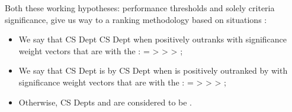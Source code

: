 \documentclass[a4paper,12pt,english]{sphinxhowto}
\begin{document}
Both these working hypotheses: performance  thresholds and solely  criteria significance, give us way to a ranking methodology based on  situations :
\begin{itemize}
\item {} 
We say that CS Dept   CS Dept  when  positively outranks  with  significance weight vectors that are  with the :  =  \textgreater{}  \textgreater{}  \textgreater{} ;

\item {} 
We say that CS Dept  is  by CS Dept  when  is positively outranked by  with  significance weight vectors that are  with the :  =  \textgreater{}  \textgreater{}  \textgreater{} ;

\item {} 
Otherwise, CS Depts  and  are considered to be .

\end{itemize}
\end{document}
